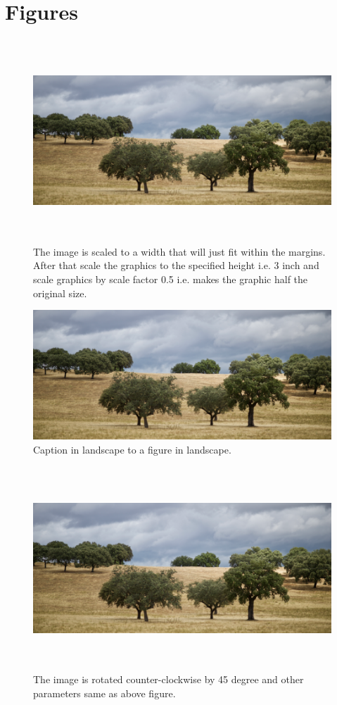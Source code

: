 \documentclass[12pt,a4paper]{report}
\begin{document}
\section{Figures}
\begin{figure}[H]
    \centering
    \includegraphics[width=\textwidth,height=3in,scale=0.5]{fig.png}
    \caption{The image is scaled to a width that will just fit within the margins. After that scale the graphics to the specified height i.e. 3 inch and scale graphics by scale factor 0.5 i.e. makes the graphic half the original size.}
\end{figure}
\begin{figure}
\centering
    \includegraphics[width=\textwidth]{fig.png}
    \caption{Caption in landscape to a figure in landscape.}
    \label{fig:LandscapeFigure}
\end{figure}
\begin{figure}[H]
    \centering
    \includegraphics[angle=45,width=\textwidth,height=3in,scale=0.5]{fig.png}
    \caption{The image is rotated counter-clockwise by 45 degree and other parameters same as above figure.}
\end{figure}
\end{document}
